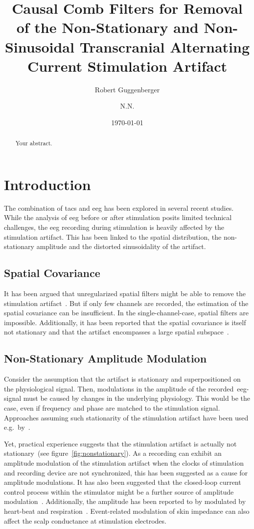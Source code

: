 \documentclass[a4paper]{article}
\title{Causal Comb Filters for Removal of the Non-Stationary and Non-Sinusoidal Transcranial Alternating Current Stimulation Artifact}
\author[1,*]{Robert Guggenberger}
\author[1]{N.N.}
\affil[1]{Department for Translational Neurosurgery, University Hospital Tübingen}
\affil[*]{Corresponding author: \email{robert.guggenberger@posteo.eu}}
\date{\today}
\newcommand{\figref}[1]{(see figure~\ref{#1})}
\begin{document}
\maketitle
\thispagestyle{fancy}

\begin{abstract}
Your abstract.
\end{abstract}

\section{Introduction}

The combination of \gls{tacs} and \gls{eeg} has been explored in several recent studies. While the analysis of \gls{eeg} before or after stimulation posits limited technical challenges, the \gls{eeg} recording during stimulation is heavily affected by the stimulation artifact. This has been linked to the spatial distribution, the non-stationary amplitude and the distorted sinusoidality of the artifact.

\subsection{Spatial Covariance}

It has been argued that unregularized spatial filters might be able to remove the stimulation artifact~\citep{Neuling_2017}. But if only few channels are recorded, the estimation of the spatial covariance can be insufficient. In the single-channel-case, spatial filters are impossible.
Additionally, it has been reported that the spatial covariance is itself not stationary and that the artifact encompasses a large spatial subspace~\citep{Noury_2016}.

\subsection{Non-Stationary Amplitude Modulation}

Consider the assumption that the artifact is stationary and superpositioned on the physiological signal.
Then, modulations in the amplitude of the recorded~\gls{eeg}-signal must be caused by changes in the underlying physiology.
This would be the case, even if frequency and phase are matched to the stimulation signal. Approaches assuming such stationarity of the stimulation artifact have been used e.g.\ by~\cite{Pogosyan_2009}.

Yet, practical experience suggests that the stimulation artifact is actually not stationary~\figref{fig:nonstationary}.
As a recording can exhibit an amplitude modulation of the stimulation artifact when the clocks of stimulation and recording device are not synchronized, this has been suggested as a cause for amplitude modulations.
It has also been suggested that the closed-loop current control process within the stimulator might be a further source of amplitude modulation~\citep{Neuling_2017}.
Additionally, the amplitude has been reported to by modulated by heart-beat and respiration~\citep{Noury_2016}. Event-related modulation of skin impedance can also affect the scalp conductance at stimulation electrodes.
\end{document}
